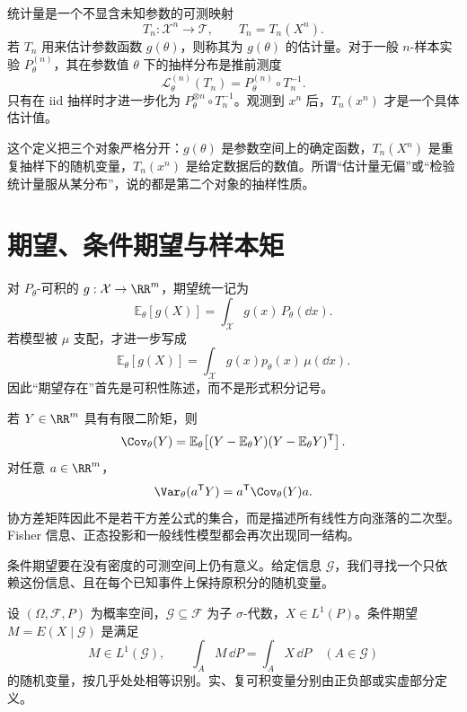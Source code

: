 \begin{definition}
统计量是一个不显含未知参数的可测映射
\[
 T_n:\mathcal X^n\to\mathcal T,
 \qquad
 T_n=T_n(X^n).
\]
若 $T_n$ 用来估计参数函数 $g(\theta)$，则称其为 $g(\theta)$ 的估计量。对于一般 $n$-样本实验 $P_\theta^{(n)}$，其在参数值 $\theta$ 下的抽样分布是推前测度
\begin{equation*}\mathcal L_\theta^{(n)}(T_n)
 =P_\theta^{(n)}\circ T_n^{-1}.
\end{equation*}
只有在 iid 抽样时才进一步化为 $P_\theta^{\otimes n}\circ T_n^{-1}$。观测到 $x^n$ 后，$T_n(x^n)$ 才是一个具体估计值。
\end{definition}

这个定义把三个对象严格分开：$g(\theta)$ 是参数空间上的确定函数，$T_n(X^n)$ 是重复抽样下的随机变量，$T_n(x^n)$ 是给定数据后的数值。所谓“估计量无偏”或“检验统计量服从某分布”，说的都是第二个对象的抽样性质。

\section{期望、条件期望与样本矩}

对 $P_\theta$-可积的 $g:\mathcal X\to\RR^m$，期望统一记为
\begin{equation*}\mathbb E_\theta[g(X)]
 =\int_{\mathcal X}g(x)\,P_\theta(\dd x).
\end{equation*}
若模型被 $\mu$ 支配，才进一步写成
\[
 \mathbb E_\theta[g(X)]
 =\int_{\mathcal X}g(x)p_\theta(x)\,\mu(\dd x).
\]
因此“期望存在”首先是可积性陈述，而不是形式积分记号。

若 $Y\in\RR^m$ 具有有限二阶矩，则
\[
 \Cov_\theta(Y)
 =\mathbb E_\theta\!
 \left[(Y-\mathbb E_\theta Y)(Y-\mathbb E_\theta Y)^{\mathsf T}\right].
\]
对任意 $a\in\RR^m$，
\[
 \Var_\theta(a^{\mathsf T}Y)
 =a^{\mathsf T}\Cov_\theta(Y)a.
\]
协方差矩阵因此不是若干方差公式的集合，而是描述所有线性方向涨落的二次型。Fisher 信息、正态投影和一般线性模型都会再次出现同一结构。

条件期望要在没有密度的可测空间上仍有意义。给定信息 $\mathcal G$，我们寻找一个只依赖这份信息、且在每个已知事件上保持原积分的随机变量。

\begin{definition}[条件期望]
设 $(\Omega,\mathcal F,P)$ 为概率空间，$\mathcal G\subseteq\mathcal F$ 为子 $\sigma$-代数，$X\in L^1(P)$。条件期望 $M=E(X\mid\mathcal G)$ 是满足
\[
 M\in L^1(\mathcal G),\qquad
 \int_A M\,\dd P=\int_A X\,\dd P\quad(A\in\mathcal G)
\]
的随机变量，按几乎处处相等识别。实、复可积变量分别由正负部或实虚部分定义。
\end{definition}

